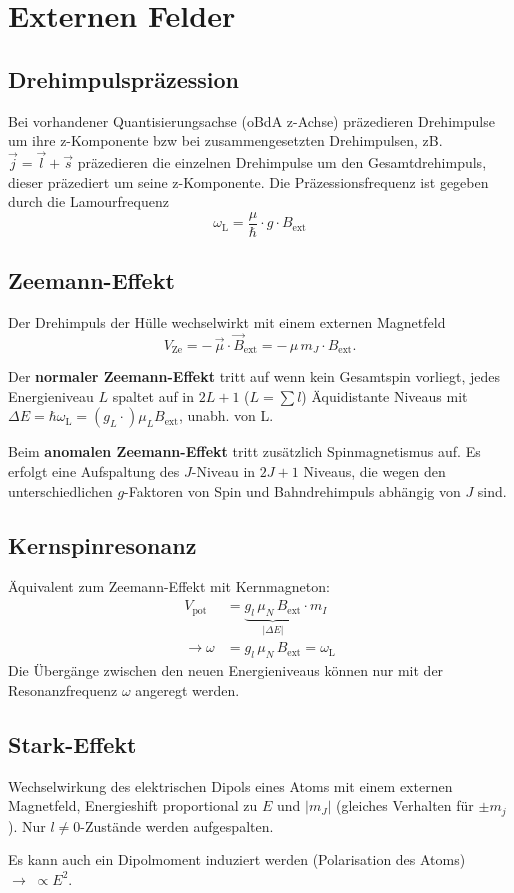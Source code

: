\section{Externen Felder}
\subsection{Drehimpulspräzession}
Bei vorhandener Quantisierungsachse (oBdA z-Achse) präzedieren Drehimpulse um ihre z-Komponente bzw bei zusammengesetzten Drehimpulsen, zB. $\vec{j} = \vec{l} + \vec{s}$ präzedieren die einzelnen Drehimpulse um den Gesamtdrehimpuls, dieser präzediert um seine z-Komponente.
Die Präzessionsfrequenz ist gegeben durch die Lamourfrequenz
\begin{equation*}
	\omega_\text{L} = \frac{\mu}{\hbar} \cdot g \cdot B_\text{ext}
\end{equation*}

\subsection{Zeemann-Effekt}
Der Drehimpuls der Hülle wechselwirkt mit einem externen Magnetfeld
\begin{equation*}
	V_\text{Ze} = - \, \vec{\mu} \cdot \vec{B}_\text{ext} = - \, \mu \, m_J \cdot B_\text{ext}.
\end{equation*}

Der \textbf{normaler Zeemann-Effekt} tritt auf wenn kein Gesamtspin vorliegt, jedes Energieniveau $L$ spaltet auf in $2L + 1$ ($L = \sum l$) Äquidistante Niveaus mit $\Delta E = \hbar \omega_\text{L} = (g_L \cdot) \mu_L B_\text{ext}$, unabh. von L.

Beim \textbf{anomalen Zeemann-Effekt} tritt zusätzlich Spinmagnetismus auf. Es erfolgt eine Aufspaltung des $J$-Niveau in $2J + 1$ Niveaus, die wegen den unterschiedlichen $g$-Faktoren von Spin und Bahndrehimpuls abhängig von $J$ sind.

\subsection{Kernspinresonanz}

Äquivalent zum Zeemann-Effekt mit Kernmagneton:
\begin{align*}
	V_\text{pot} &= \underbrace{g_l \, \mu_N \, B_\text{ext}}_{|\Delta E|} \cdot m_I\\
	\rightarrow \omega &= g_l \, \mu_N \, B_\text{ext} = \omega_\text{L}
\end{align*}
Die Übergänge zwischen den neuen Energieniveaus können nur mit der Resonanzfrequenz $\omega$ angeregt werden.

\subsection{Stark-Effekt}

Wechselwirkung des elektrischen Dipols eines Atoms mit einem externen Magnetfeld, Energieshift proportional zu $E$ und $|m_J|$ (gleiches Verhalten für $\pm m_j$).
Nur $l \neq 0$-Zustände werden aufgespalten.

Es kann auch ein Dipolmoment induziert werden (Polarisation des Atoms) $\rightarrow \; \propto E^2$.
